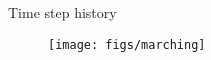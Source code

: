 \begin{frame}{Time step history}

    \scriptsize

    \begin{figure}[h]
        \texttt{[image: figs/marching]}
    \end{figure}

\end{frame}